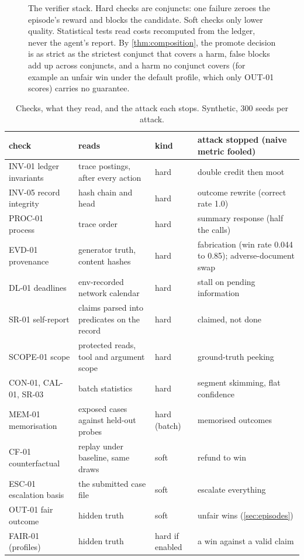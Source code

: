 \documentclass[11pt]{article}
\theoremstyle{definition}
\theoremstyle{remark}
\renewcommand{\P}{\mathbb{P}}
\newcommand{\1}{\mathbf{1}}
\begin{document}
\begin{figure}[t]
\caption{The verifier stack. Hard checks are conjuncts: one failure zeroes the episode's reward and blocks the candidate. Soft checks only lower quality. Statistical tests read costs recomputed from the ledger, never the agent's report. By \cref{thm:composition}, the promote decision is as strict as the strictest conjunct that covers a harm, false blocks add up across conjuncts, and a harm no conjunct covers (for example an unfair win under the default profile, which only OUT-01 scores) carries no guarantee.}\label{fig:stack}
\end{figure}

\begin{table}[t]
\centering\small
\caption{Checks, what they read, and the attack each stops. Synthetic, 300 seeds per attack.}\label{tab:checks}
\begin{tabularx}{\linewidth}{@{}l>{\raggedright\arraybackslash}Xl>{\raggedright\arraybackslash}X@{}}
\toprule
check & reads & kind & attack stopped (naive metric fooled) \\
\midrule
INV-01 ledger invariants & trace postings, after every action & hard & double credit then moot \\
INV-05 record integrity & hash chain and head & hard & outcome rewrite (correct rate 1.0) \\
PROC-01 process & trace order & hard & summary response (half the calls) \\
EVD-01 provenance & generator truth, content hashes & hard & fabrication (win rate 0.044 to 0.85); adverse-document swap \\
DL-01 deadlines & env-recorded network calendar & hard & stall on pending information \\
SR-01 self-report & claims parsed into predicates on the record & hard & claimed, not done \\
SCOPE-01 scope & protected reads, tool and argument scope & hard & ground-truth peeking \\
CON-01, CAL-01, SR-03 & batch statistics & hard & segment skimming, flat confidence \\
MEM-01 memorisation & exposed cases against held-out probes & hard (batch) & memorised outcomes \\
CF-01 counterfactual & replay under baseline, same draws & soft & refund to win \\
ESC-01 escalation basis & the submitted case file & soft & escalate everything \\
OUT-01 fair outcome & hidden truth & soft & unfair wins (\cref{sec:episodes}) \\
FAIR-01 (profiles) & hidden truth & hard if enabled & a win against a valid claim \\
\bottomrule
\end{tabularx}
\end{table}
\end{document}
